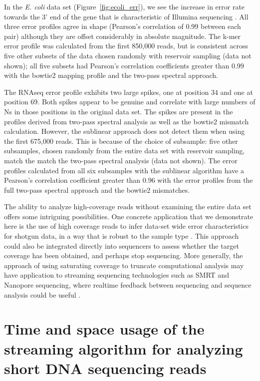 In the {\em E. coli} data set (Figure~\ref{fig:ecoli_err}), we see the increase
in error rate towards the 3' end of the gene that is characteristic of Illumina
sequencing \cite{biases}.  All three error profiles agree in shape (Pearson's
correlation of 0.99 between each pair) although they are offset considerably in
absolute magnitude. The k-mer error profile was calculated from the first
850,000 reads, but is consistent across five other subsets of the data chosen
randomly with reservoir sampling (data not shown); all five subsets had
Pearson's correlation coefficients greater than 0.99 with the bowtie2 mapping
profile and the two-pass spectral approach.

The RNAseq error profile exhibits two large spikes, one at position 34 and one
at position 69.  Both spikes appear to be genuine and correlate with large
numbers of Ns in those positions in the original data set.  The spikes are
present in the profiles derived from two-pass spectral analysis as well as the
bowtie2 mismatch calculation.  However, the sublinear approach does not detect
them when using the first 675,000 reads.  This is because of the choice of
subsample: five other subsamples, chosen randomly from the entire data set with
reservoir sampling, match the match the two-pass spectral analysis (data not
shown).  The error profiles calculated from all six subsamples with the
sublinear algorithm have a Pearson's correlation coefficient greater than 0.96
with the error profiles from the full two-pass spectral approach and the
bowtie2 mismatches.


The ability to analyze high-coverage reads without examining the
entire data set offers some intriguing possibilities.  One concrete
application that we demonstrate here is the use of high coverage reads
to infer data-set wide error characteristics for shotgun data, in a
way that is robust to the sample type \cite{drisee}.  This approach
could also be integrated directly into sequencers to assess whether
the target coverage has been obtained, and perhaps stop sequencing.
More generally, the approach of using saturating coverage to truncate
computational analysis may have application to streaming sequencing
technologies such as SMRT and Nanopore sequencing, where realtime
feedback between sequencing and sequence analysis could be useful
\cite{pacbio,nanopore}.


\section{Time and space usage of the streaming algorithm for analyzing 
short DNA sequencing reads}

